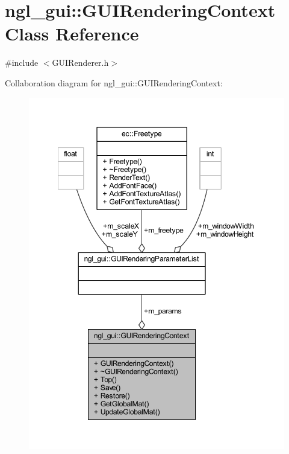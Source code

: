 \hypertarget{classngl__gui_1_1_g_u_i_rendering_context}{}\section{ngl\+\_\+gui\+:\+:G\+U\+I\+Rendering\+Context Class Reference}
\label{classngl__gui_1_1_g_u_i_rendering_context}


{\ttfamily \#include $<$G\+U\+I\+Renderer.\+h$>$}



Collaboration diagram for ngl\+\_\+gui\+:\+:G\+U\+I\+Rendering\+Context\+:\nopagebreak
\begin{figure}[H]
\begin{center}
\leavevmode
\includegraphics[width=349pt]{classngl__gui_1_1_g_u_i_rendering_context__coll__graph}
\end{center}
\end{figure}
